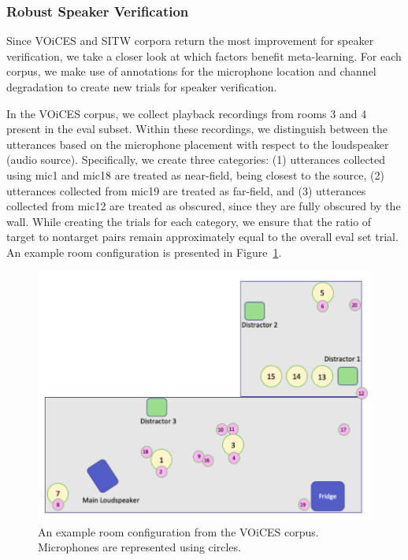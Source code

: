 \subsubsection{Robust Speaker Verification}
Since VOiCES and SITW corpora return the most improvement for speaker verification, we take a closer look at which factors benefit meta-learning. For each corpus, we make use of annotations for the microphone location and channel degradation to create new trials for speaker verification. 

In the VOiCES corpus, we collect playback recordings from rooms 3 and 4 present in the eval subset. Within these recordings, we distinguish between the utterances based on the microphone placement with respect to the loudspeaker (audio source). Specifically, we create three categories: (1) utterances collected using mic1 and mic18 are treated as near-field, being closest to the source, (2) utterances collected from mic19 are treated as far-field, and (3) utterances collected from mic12 are treated as obscured, since they are fully obscured by the wall. 
While creating the trials for each category, we ensure that the ratio of target to nontarget pairs remain approximately equal to the overall eval set trial. An example room configuration is presented in Figure~\ref{fig:voicesRoom}.

\begin{figure}[h]
    \centering
    \includegraphics[scale=0.27]{fig/voices_room.png}
    \caption[An example room configuration from the VOiCES corpus]{An example room configuration from the VOiCES corpus\protect\footnotemark. Microphones are represented using circles. }
    \label{fig:voicesRoom}
\end{figure}

